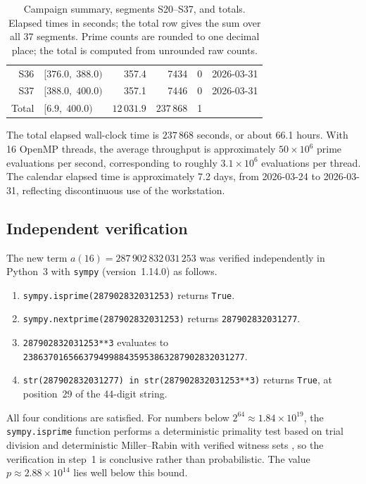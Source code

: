 \documentclass[12pt,reqno]{article}
\theoremstyle{plain}
\theoremstyle{definition}
\theoremstyle{remark}
\begin{document}
\begin{table}[ht]
\begin{center}
\begin{tabular}{rlrrrl}
S36 & $[376.0,\;388.0)$ & 357.4 & 7434 & 0 & 2026-03-31 \\
S37 & $[388.0,\;400.0)$ & 357.1 & 7446 & 0 & 2026-03-31 \\
\midrule
Total & $[6.9,\;400.0)$ & $12\,031.9$ & $237\,868$ & 1 & \\
\bottomrule
\end{tabular}
\caption{Campaign summary, segments S20--S37, and totals.
Elapsed times in seconds; the total row gives the sum over all 37
segments.
Prime counts are rounded to one decimal place; the total is computed
from unrounded raw counts.}
\label{tab:campaign_b}
\end{center}
\end{table}

The total elapsed wall-clock time is $237\,868$ seconds,
or about 66.1 hours.
With 16 OpenMP threads, the average throughput is approximately
$50 \times 10^6$ prime evaluations per second, corresponding to
roughly $3.1 \times 10^6$ evaluations per thread.
The calendar elapsed time is approximately 7.2 days, from
2026-03-24 to 2026-03-31, reflecting discontinuous use of the
workstation.

\subsection{Independent verification}
\label{sec:verification}

The new term $a(16) = 287\,902\,832\,031\,253$ was verified
independently in Python~3 with \texttt{sympy}
(version~1.14.0) as follows.

\begin{enumerate}
\item \texttt{sympy.isprime(287902832031253)} returns \texttt{True}.
\item \texttt{sympy.nextprime(287902832031253)} returns
      \texttt{287902832031277}.
\item \texttt{287902832031253**3} evaluates to\\
      \texttt{23863701656637949988435953863287902832031277}.
\item \texttt{str(287902832031277) in str(287902832031253**3)}
      returns \texttt{True}, at position~29 of the 44-digit string.
\end{enumerate}

All four conditions are satisfied.
For numbers below $2^{64} \approx 1.84 \times 10^{19}$,
the \texttt{sympy.isprime} function performs a deterministic
primality test based on trial division and deterministic
Miller--Rabin with verified witness sets \cite{SymPy},
so the verification in step~1 is conclusive rather than probabilistic.
The value $p \approx 2.88 \times 10^{14}$ lies well below this bound.
\end{document}
